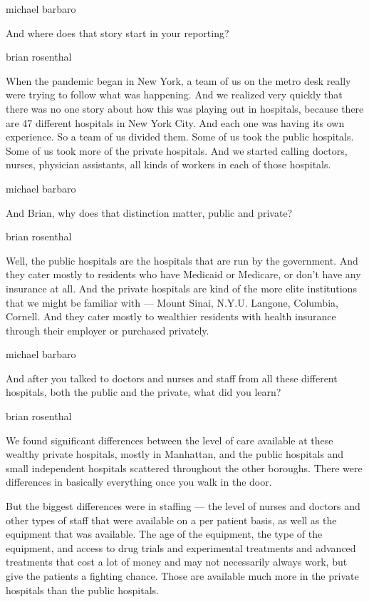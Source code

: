 michael barbaro

And where does that story start in your reporting?

brian rosenthal

When the pandemic began in New York, a team of us on the metro desk
really were trying to follow what was happening. And we realized very
quickly that there was no one story about how this was playing out in
hospitals, because there are 47 different hospitals in New York City.
And each one was having its own experience. So a team of us divided
them. Some of us took the public hospitals. Some of us took more of the
private hospitals. And we started calling doctors, nurses, physician
assistants, all kinds of workers in each of those hospitals.

michael barbaro

And Brian, why does that distinction matter, public and private?

brian rosenthal

Well, the public hospitals are the hospitals that are run by the
government. And they cater mostly to residents who have Medicaid or
Medicare, or don't have any insurance at all. And the private hospitals
are kind of the more elite institutions that we might be familiar with
--- Mount Sinai, N.Y.U. Langone, Columbia, Cornell. And they cater
mostly to wealthier residents with health insurance through their
employer or purchased privately.

michael barbaro

And after you talked to doctors and nurses and staff from all these
different hospitals, both the public and the private, what did you
learn?

brian rosenthal

We found significant differences between the level of care available at
these wealthy private hospitals, mostly in Manhattan, and the public
hospitals and small independent hospitals scattered throughout the other
boroughs. There were differences in basically everything once you walk
in the door.

But the biggest differences were in staffing --- the level of nurses and
doctors and other types of staff that were available on a per patient
basis, as well as the equipment that was available. The age of the
equipment, the type of the equipment, and access to drug trials and
experimental treatments and advanced treatments that cost a lot of money
and may not necessarily always work, but give the patients a fighting
chance. Those are available much more in the private hospitals than the
public hospitals.

